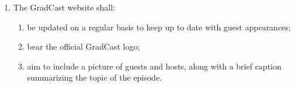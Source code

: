 \begin{enumerate} [label*=\arabic*., align=left]
\begin{enumerate}[label*=\arabic*., align=left]
\item maintain episodes at approximately 30 minutes in length on a weekly basis or as designated by CHRW;
\item maintain at least one (1) pre-recorded podcast episode to maintain a weekly schedule as needed should circumstances arise;
\item be comprised of at least one (1) student guest per episode.
\end{enumerate}
\item The GradCast website shall:
\begin{enumerate}[label*=\arabic*., align=left]	
\item be updated on a regular basis to keep up to date with guest appearances;
\item bear the official GradCast logo;
\item aim to include a picture of guests and hosts, along with a brief caption summarizing the topic of the episode.
\end{enumerate}
\end{enumerate}